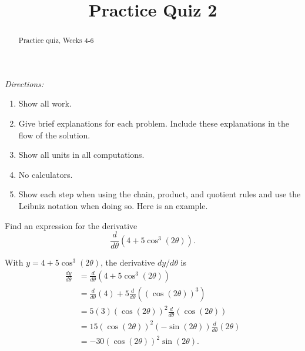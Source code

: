 \documentclass{ximera}
\title{Practice Quiz 2}
\begin{document}
\begin{abstract}
Practice quiz, Weeks 4-6
\end{abstract}
\maketitle

\emph{Directions:}

\begin{enumerate}
\item Show all work.

\item Give brief explanations for each problem. Include these explanations in the flow of the solution.

\item Show all units in all computations.

\item No calculators.

\item Show each step when using the chain, product, and quotient rules and use the Leibniz notation when doing so. Here is an example.

\end{enumerate}

\begin{example}
Find an expression for the derivative
\[
    \frac{d}{d\theta}\left( 4 + 5\cos^3(2\theta) \right) .
\]

\begin{explanation}
With $y=4 + 5\cos^3(2\theta)$, the derivative $dy/d\theta$ is 
\begin{align*}
\frac{dy}{d\theta} &= \frac{d}{d\theta}\left(   4 + 5\cos^3(2\theta)   \right) \\
                          & = \frac{d}{d\theta}\left( 4 \right) + 5\frac{d}{d\theta}\left( \left( \cos(2\theta)  \right)^3  \right) \\
                           &=  5(3) (\cos(2\theta))^2 \frac{d}{d\theta}\left(  \cos (2\theta) \right) \\
                          &= 15(\cos(2\theta))^2 (-\sin(2\theta))\frac{d}{d\theta}(2\theta) \\
                           &= -30(\cos(2\theta))^2\sin(2\theta) .
\end{align*}


\end{explanation}
\end{example}
\end{document}
